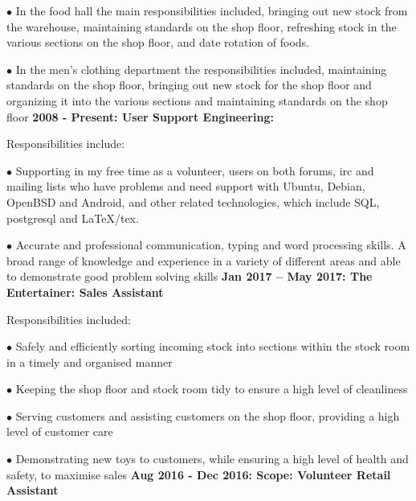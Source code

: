 \documentclass[10pt,a4paper]{book}
\begin{document}
\begin{flushleft}
  \item[$\bullet$] In the food hall the main responsibilities included, bringing out new stock from the warehouse, maintaining standards on the shop floor, refreshing stock in the various sections on the shop floor, and date rotation of foods. 
  \item[$\bullet$] In the men's clothing department the responsibilities included, maintaining standards on the shop floor, bringing out new stock for the shop floor and organizing it into the various sections and maintaining standards on the shop floor
    \linebreak{}
    \linebreak{}
  \textbf {2008 - Present: User Support Engineering:} 

Responsibilities include:

  \item[$\bullet$]Supporting in my free time as a volunteer, users on both forums, irc and mailing lists who have problems and need support with Ubuntu, Debian, OpenBSD and Android, and other related technologies, which include SQL, postgresql and LaTeX/tex. 
  \item[$\bullet$] Accurate and professional communication, typing and word processing skills. A broad range of knowledge and experience in a variety of different areas and able to demonstrate good problem solving skills
    \linebreak{}
    \linebreak{}
\textbf {Jan 2017 -- May 2017: The Entertainer: Sales Assistant}
  
Responsibilities included:

  \item[$\bullet$]Safely and efficiently sorting incoming stock into sections within the stock room in a timely and organised manner

  \item[$\bullet$]Keeping the shop floor and stock room tidy to ensure a high level of cleanliness

  \item[$\bullet$]Serving customers and assisting customers on the shop floor, providing a high level of customer care

  \item[$\bullet$]Demonstrating new toys to customers, while ensuring a high level of health and safety, to maximise sales
    \linebreak{}
    \linebreak{}
  \textbf {Aug 2016 - Dec 2016: Scope: Volunteer Retail Assistant}


\end{flushleft}
\end{document}
